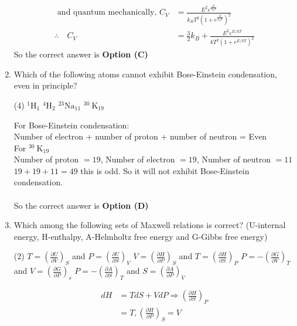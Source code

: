 \begin{enumerate}
\begin{answer}
\begin{align*}
\text{	and quantum mechanically, }C_{V}&=\frac{E^{2} e^{\frac{E}{k_{B} T}}}{k_{B} T^{2}\left(1+e^{\frac{E}{k_{B} T}}\right)^{2}}\\
\therefore \quad C_{V}&=\frac{3}{2} k_{B}+\frac{E^{2} e^{E / k T}}{k T^{2}\left(1+e^{E / k T}\right)^{2}}
\end{align*}
So the correct answer is \textbf{Option (C)}
\end{answer}
\item 	 Which of the following atoms cannot exhibit Bose-Einstein condensation, even in principle?
{}
\begin{tasks}(4)
\task[\textbf{A.}]  ${ }^{1} \mathrm{H}_{1}$
\task[\textbf{B.}] ${ }^{4} \mathrm{H}_{2}$
\task[\textbf{C.}] ${ }^{23} \mathrm{Na}_{11}$
\task[\textbf{D.}] ${ }^{30} \mathrm{~K}_{19}$
\end{tasks}
\begin{answer}
For Bose-Einstein condensation:\\
Number of electron + number of proton + number of neutron = Even\\
For ${ }^{30} \mathrm{~K}_{19}$\\
Number of proton $=19$, Number of electron $=19$, Number of neutron $=11$\\
$19+19+11=49$ this is odd. So it will not exhibit Bose-Einstein condensation.\\\\
So the correct answer is \textbf{Option (D)}
\end{answer}
	\item Which among the following sets of Maxwell relations is correct? (U-internal energy, H-enthalpy, A-Helmholtz free energy and G-Gibbs free energy)
{	}
\begin{tasks}(2)
\task[\textbf{A.}] $T=\left(\frac{\partial U}{\partial V}\right)_{S}$ and $P=\left(\frac{\partial U}{\partial S}\right)_{V}$
\task[\textbf{B.}] $V=\left(\frac{\partial H}{\partial P}\right)_{S}$ and $T=\left(\frac{\partial H}{\partial S}\right)_{P}$
\task[\textbf{C.}]  $P=-\left(\frac{\partial G}{\partial V}\right)_{T}$ and $V=\left(\frac{\partial G}{\partial P}\right)_{s}$
\task[\textbf{D.}] $P=-\left(\frac{\partial A}{\partial S}\right)_{T}$ and $S=\left(\frac{\partial A}{\partial P}\right)_{V}$
\end{tasks}
\begin{answer}
\begin{align*}
d H&=T d S+V d P \Rightarrow\left(\frac{\partial H}{\partial S}\right)_{P}\\&=T,\left(\frac{\partial H}{\partial P}\right)_{S}=V

\end{align*}
\end{answer}
\end{enumerate}
